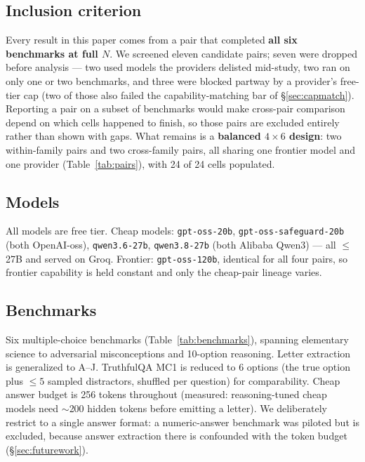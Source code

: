 \documentclass[conference]{IEEEtran}
\begin{document}
\subsection{Inclusion criterion}
\label{sec:inclusion}
Every result in this paper comes from a pair that completed \textbf{all six
benchmarks at full $N$}. We screened eleven candidate pairs; seven were dropped
before analysis --- two used models the providers delisted mid-study, two ran on
only one or two benchmarks, and three were blocked partway by a provider's
free-tier cap (two of those also failed the capability-matching bar of
\S\ref{sec:capmatch}). Reporting a pair on a subset of benchmarks would make
cross-pair comparison depend on which cells happened to finish, so those pairs
are excluded entirely rather than shown with gaps. What remains is a
\textbf{balanced $4\times6$ design}: two within-family pairs and two
cross-family pairs, all sharing one frontier model and one provider
(Table~\ref{tab:pairs}), with 24 of 24 cells populated.

\subsection{Models}
All models are free tier. Cheap models: \texttt{gpt-oss-20b},
\texttt{gpt-oss-safeguard-20b} (both OpenAI-oss), \texttt{qwen3.6-27b},
\texttt{qwen3.8-27b} (both Alibaba Qwen3) --- all $\leq$27B and served on Groq.
Frontier: \texttt{gpt-oss-120b}, identical for all four pairs, so frontier
capability is held constant and only the cheap-pair lineage varies.

\subsection{Benchmarks}
Six multiple-choice benchmarks (Table~\ref{tab:benchmarks}), spanning
elementary science to adversarial misconceptions and 10-option reasoning. Letter
extraction is generalized to A--J. TruthfulQA MC1 is reduced to 6 options (the
true option plus $\leq 5$ sampled distractors, shuffled per question) for
comparability. Cheap answer budget is 256 tokens throughout (measured:
reasoning-tuned cheap models need $\sim$200 hidden tokens before emitting a
letter). We deliberately restrict to a single answer format: a numeric-answer
benchmark was piloted but is excluded, because answer extraction there is
confounded with the token budget (\S\ref{sec:futurework}).
\end{document}
